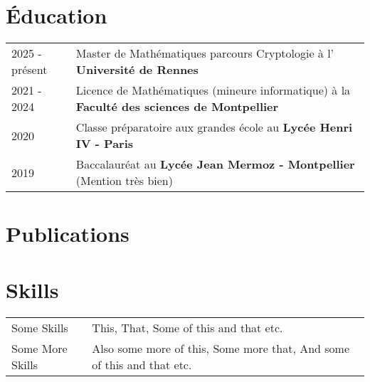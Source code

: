 \documentclass[a4paper,12pt]{article}
\begin{document}
\section{Éducation}
\begin{tabularx}{\linewidth}{@{}l X@{}}	


2025 - présent & Master de Mathématiques parcours Cryptologie à l' \textbf{Université de Rennes} \hfill  \\ 

2021 - 2024 & Licence de Mathématiques (mineure informatique) à la \textbf{Faculté des sciences de Montpellier} \hfill   \\

2020 & Classe préparatoire aux grandes école au \textbf{Lycée Henri IV - Paris} \hfill   \\

2019 & Baccalauréat au \textbf{Lycée Jean Mermoz - Montpellier} \hfill (Mention très bien)
\end{tabularx}

\section{Publications}
\begin{refsection}
\nocite{*}
\printbibliography[heading=none]
\end{refsection}

\section{Skills}
\begin{tabularx}{\linewidth}{@{}l X@{}}
Some Skills &  \normalsize{This, That, Some of this and that etc.}\\
Some More Skills  &  \normalsize{Also some more of this, Some more that, And some of this and that etc.}\\  
\end{tabularx}

\vfill
{}
\end{document}
